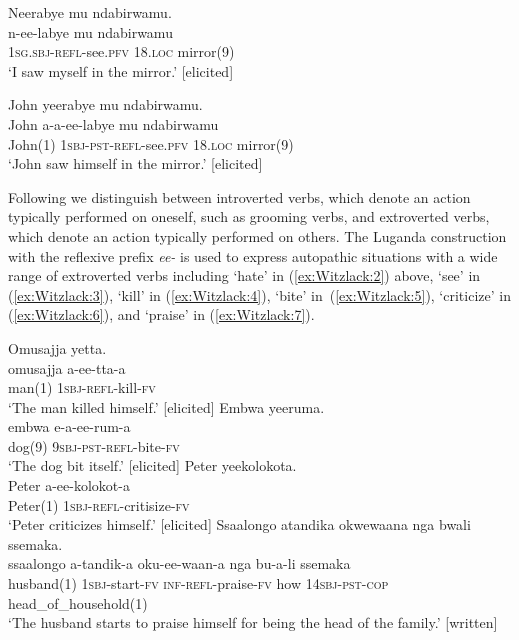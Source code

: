\documentclass[output=paper,colorlinks,citecolor=brown,
]{langscibook}
\begin{document}
\ea\label{ex:Witzlack:3}
\ea  \label{ex:Witzlack:3a}
\glll	Neerabye mu ndabirwamu.\\
		n-ee-labye 			mu 		ndabirwamu\\
		\textsc{1sg.sbj}-\textsc{refl}-see.\textsc{pfv}	18.\textsc{loc} 	mirror(9)\\
		\glt	‘I saw myself in the mirror.’ [elicited]

\ex \label{ex:Witzlack:3b}
	\glll John yeerabye mu ndabirwamu.\\
		John 	a-a-ee-labye 				mu		ndabirwamu\\
		John(1)	\textsc{1sbj}-\textsc{pst}-\textsc{refl}-see.\textsc{pfv}		18.\textsc{loc} 	mirror(9)\\
		\glt ‘John saw himself in the mirror.’ [elicited]
\z 
\z 

Following \citet{Haiman1985, KoenigVezzosi2004} we distinguish between introverted verbs, which denote an action typically performed on oneself, such as grooming verbs, and extroverted verbs, which denote an action typically performed on others. 
The Luganda construction with the reflexive prefix \emph{ee-} is used to express autopathic situations with a wide range of extroverted verbs including ‘hate’ in (\ref{ex:Witzlack:2}) above, ‘see’ in (\ref{ex:Witzlack:3}), ‘kill’ in (\ref{ex:Witzlack:4}), ‘bite’ in~(\ref{ex:Witzlack:5}), ‘criticize’ in (\ref{ex:Witzlack:6}), and ‘praise’ in (\ref{ex:Witzlack:7}).

\ea\label{ex:Witzlack:4}
	\glll	Omusajja yetta.\\
        	omusajja 	a-ee-tta-a\\
        	man(1)	\textsc{1sbj}-\textsc{refl}-kill-\textsc{fv}\\
	\glt    ‘The man killed himself.’ [elicited]
\z 
\ea\label{ex:Witzlack:5}
	\glll   Embwa yeeruma.\\
        	embwa	e-a-ee-rum-a\\
        	dog(9)	\textsc{9sbj}-\textsc{pst}-\textsc{refl}-bite-\textsc{fv}\\
	\glt    ‘The dog bit itself.’ [elicited]
\z
\ea\label{ex:Witzlack:6}
	\glll	Peter yeekolokota.\\
        	Peter	a-ee-kolokot-a\\
        	Peter(1) \textsc{1sbj}-\textsc{refl}-critisize-\textsc{fv}\\
	\glt    ‘Peter criticizes himself.’ [elicited]
\z
\ea\label{ex:Witzlack:7}
	\glll   Ssaalongo atandika okwewaana nga bwali ssemaka.\\
        	ssaalongo	a-tandik-a 	oku-ee-waan-a nga		bu-a-li			ssemaka\\
        husband(1)	\textsc{1sbj}-start-\textsc{fv}	\textsc{inf}-\textsc{refl}-praise-\textsc{fv} how 14\textsc{sbj}-\textsc{pst}-\textsc{cop} head\_of\_household(1)\\
	\glt   ‘The husband starts to praise himself for being the head of the family.’ [written]%
\z
\end{document}
